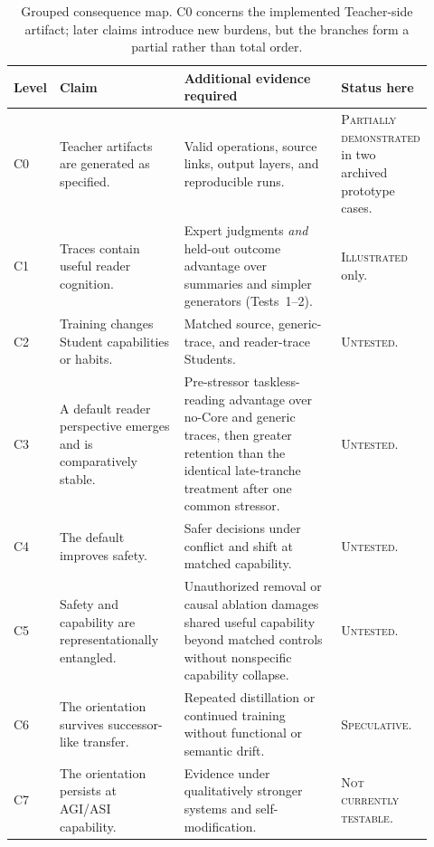 \documentclass[11pt]{article}
\newcommand{\statusIllustrated}{\textcolor{hypothesisBlue}{\textsc{Illustrated}}}
\newcommand{\statusUntested}{\textcolor{hypothesisBlue}{\textsc{Untested}}}
\newcommand{\statusSpeculative}{\textcolor{speculationPurple}{\textsc{Speculative}}}
\newcommand{\statusNotTestable}{\textcolor{speculationPurple}{\textsc{Not currently testable}}}
\begin{document}
\begin{table}[ht]
\centering
\small
\begin{tabular}{@{}>{\raggedright\arraybackslash}p{0.07\linewidth}
                    >{\raggedright\arraybackslash}p{0.30\linewidth}
                    >{\raggedright\arraybackslash}p{0.39\linewidth}
                    >{\raggedright\arraybackslash}p{0.16\linewidth}@{}}
\toprule
\textbf{Level} & \textbf{Claim} & \textbf{Additional evidence required} & \textbf{Status here} \\
\midrule
C0 & Teacher artifacts are generated as specified. & Valid operations, source links, output layers, and reproducible runs. & \textcolor{hypothesisBlue}{\textsc{Partially demonstrated}} in two archived prototype cases. \\
C1 & Traces contain useful reader cognition. & Expert judgments \emph{and} held-out outcome advantage over summaries and simpler generators (Tests~1--2). & \statusIllustrated{} only. \\
C2 & Training changes Student capabilities or habits. & Matched source, generic-trace, and reader-trace Students. & \statusUntested. \\
C3 & A default reader perspective emerges and is comparatively stable. & Pre-stressor taskless-reading advantage over no-Core and generic traces, then greater retention than the identical late-tranche treatment after one common stressor. & \statusUntested. \\
C4 & The default improves safety. & Safer decisions under conflict and shift at matched capability. & \statusUntested. \\
C5 & Safety and capability are representationally entangled. & Unauthorized removal or causal ablation damages shared useful capability beyond matched controls without nonspecific capability collapse. & \statusUntested. \\
C6 & The orientation survives successor-like transfer. & Repeated distillation or continued training without functional or semantic drift. & \statusSpeculative. \\
C7 & The orientation persists at AGI/ASI capability. & Evidence under qualitatively stronger systems and self-modification. & \statusNotTestable. \\
\bottomrule
\end{tabular}
\caption{Grouped consequence map. C0 concerns the implemented Teacher-side artifact; later claims introduce new burdens, but the branches form a partial rather than total order.}
\label{tab:consequence-ladder}
\end{table}
\end{document}
